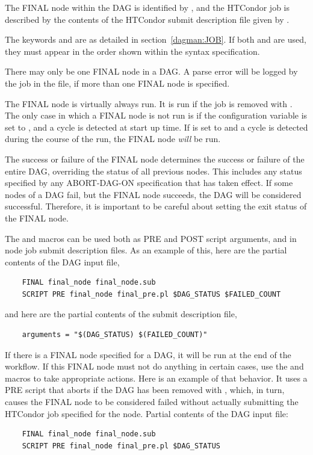   
 

The FINAL node within the DAG is identified by , 
and the HTCondor job
is described by the contents of the HTCondor submit description file
given by .

The keywords  and  
are as detailed in section~\ref{dagman:JOB}.
If both  and  are used, 
they must appear in the order shown within the syntax specification.

There may only be one FINAL node in a DAG.
A parse error will be logged by the  job in the
 file,
if more than one FINAL node is specified.

The FINAL node is virtually always run.
It is run if the  job is removed with .
The only case in which a FINAL node is not run
is if the configuration variable  
is set to ,
and a cycle is detected at start up time.
If  is set to  and
a cycle is detected during the course of the run, 
the FINAL node \emph{will} be run.

The success or failure of the FINAL node 
determines the success or failure of the entire DAG,
overriding the status of all previous nodes.
This includes any status specified by any ABORT-DAG-ON specification
that has taken effect.
If some nodes of a DAG fail,
but the FINAL node succeeds, the DAG will be considered successful.
Therefore, it is important
to be careful about setting the exit status of the FINAL node.

The  and  macros can be used both
as PRE and POST script arguments, and in node job submit description files.
As an example of this, here are the partial contents of the DAG input file,
\begin{verbatim}
    FINAL final_node final_node.sub
    SCRIPT PRE final_node final_pre.pl $DAG_STATUS $FAILED_COUNT
\end{verbatim}

and here are the partial contents of the submit description file, 
\begin{verbatim}
    arguments = "$(DAG_STATUS) $(FAILED_COUNT)"
\end{verbatim}

If there is a FINAL node specified for a DAG, 
it will be run at the end of the workflow.
If this FINAL node must not do anything in certain cases, 
use the  and 
macros to take appropriate actions.  
Here is an example of that behavior.
It uses a PRE script that aborts if the DAG has been removed with ,
which, in turn,
causes the FINAL node to be considered failed without actually submitting the
HTCondor job specified for the node.
Partial contents of the DAG input file:
\begin{verbatim}
    FINAL final_node final_node.sub
    SCRIPT PRE final_node final_pre.pl $DAG_STATUS
\end{verbatim}

